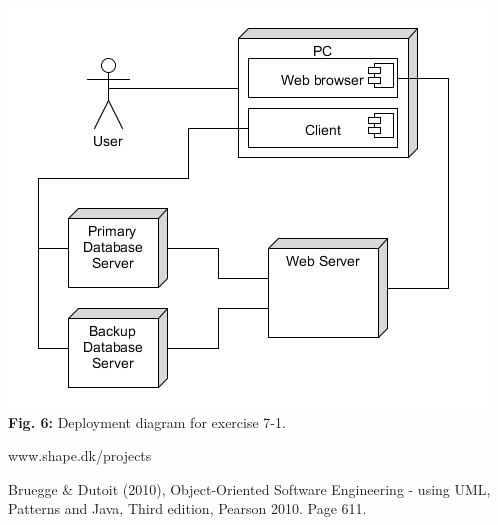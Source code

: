 \documentclass[12pt]{article}
\begin{document}
\includegraphics[scale=0.7]{7-1}\\
\textbf{Fig. 6:} Deployment diagram for exercise 7-1.










\newpage
\begin{thebibliography}{9}

  www.shape.dk/projects
  
Bruegge \& Dutoit (2010), Object-Oriented Software Engineering - using UML, Patterns and Java, Third edition, Pearson 2010. Page 611.

\end{thebibliography}
\end{document}
